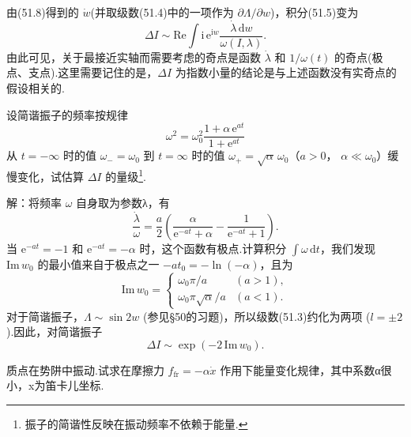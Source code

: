 由(51.8)得到的 $\dot{w}$(并取级数(51.4)中的一项作为
$\partial\Lambda/\partial w$)，积分(51.5)变为
\begin{equation}
  \Delta I\sim\mathrm{Re}\int\mathrm{i}\,\mathrm{e}^{\mathrm{i}w}
  \frac{\dot{\lambda}\,\mathrm{d}w}{\omega(I,\lambda)}.
\end{equation}
由此可见，关于最接近实轴而需要考虑的奇点是函数 $\dot{\lambda}$ 和
$1/\omega(t)$
的奇点(极点、支点).这里需要记住的是，$\Delta I$
为指数小量的结论是与上述函数没有实奇点的假设相关的.

\begin{xiti}

\quad 设简谐振子的频率按规律
\begin{equation*}
  \omega^2=\omega_0^2\frac{1+\alpha\,\mathrm{e}^{at}}{1+\mathrm{e}^{at}}
\end{equation*}
从 $t=-\infty$ 时的值 $\omega_-=\omega_0$ 到 $t=\infty$
时的值 $\omega_+=\sqrt{\alpha}\,\omega_0$（$a>0$，
$\alpha\ll\omega_0$）缓慢变化，试估算 $\Delta I$ 的量级\footnote{振子的简谐性反映在振动频率不依赖于能量.}.

解：将频率 $\omega$ 自身取为参数λ，有
\begin{equation*}
  \frac{\dot{\lambda}}{\omega}
  =\frac{a}{2}\left(\frac{\alpha}{\mathrm{e}^{-at}+\alpha}
  -\frac{1}{\mathrm{e}^{-at}+1}\right).
\end{equation*}
当 $\mathrm{e}^{-at}=-1$ 和 $\mathrm{e}^{-at}=-\alpha$
时，这个函数有极点.计算积分 $\int\omega\,\mathrm{d}t$，我们发现
$\mathrm{Im}\,w_0$
的最小值来自于极点之一 $-at_0=-\ln(-\alpha)$，且为
\begin{equation*}
  \mathrm{Im}\,w_0=
  \begin{cases}
  \omega_0\pi/a & (a>1),\\[2pt]
  \omega_0\pi\sqrt{\alpha}/a & (a<1).
  \end{cases}
\end{equation*}
对于简谐振子，$\Lambda\sim\sin 2w$
(参见§50的习题)，所以级数(51.3)约化为两项 ($l=\pm 2$).因此，对简谐振子
\begin{equation*}
  \Delta I\sim\exp(-2\,\mathrm{Im}\,w_0).
\end{equation*}

\quad 质点在势阱中振动.试求在摩擦力
$f_{\mathrm{fr}}=-\alpha\dot{x}$
作用下能量变化规律，其中系数α很小，x为笛卡儿坐标.


\end{xiti}
